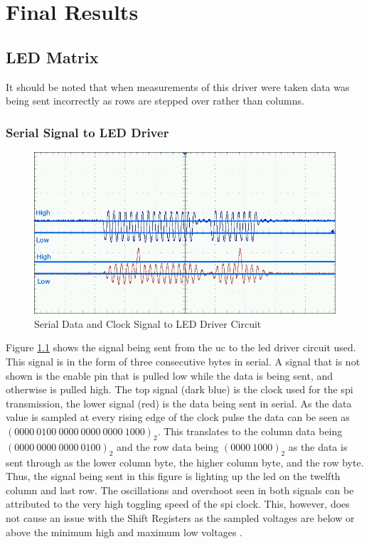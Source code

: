 \documentclass[12pt,a4paper]{report}
\begin{document}
\chapter{Final Results}
\section{LED Matrix}
It should be noted that when measurements of this driver were taken data was being sent incorrectly as rows are stepped over rather than columns.
\subsection{Serial Signal to LED Driver}
\begin{figure}[h!]
	\centering
	\includegraphics[width=0.75 \textwidth]{F0010TEK.jpg}
	\caption{Serial Data and Clock Signal to LED Driver Circuit}
	\label{fig:serdatclkLED}
\end{figure}
\noindent Figure \ref{fig:serdatclkLED} shows the signal being sent from the \ac{uc} to the \ac{led} driver circuit used. This signal is in the form of three consecutive bytes in serial. A signal that is not shown is the enable pin that is pulled low while the data is being sent, and otherwise is pulled high. The top signal (dark blue) is the clock used for the \ac{spi} transmission, the lower signal (red) is the data being sent in serial. As the data value is sampled at every rising edge of the clock pulse the data can be seen as $(0000\ 0100\ 0000\ 0000\ 0000\ 1000)_2$. This translates to the column data being $(0000\ 0000\ 0000\ 0100)_2$ and the row data being $(0000\ 1000)_2$ as the data is sent through as the lower column byte, the higher column byte, and the row byte. Thus, the signal being sent in this figure is lighting up the \ac{led} on the twelfth column and last row. The oscillations and overshoot seen in both signals can be attributed to the very high toggling speed of the \ac{spi} clock. This, however, does not cause an issue with the Shift Registers as the sampled voltages are below or above the minimum high and maximum low voltages \cite{595}.
\newpage
\end{document}
